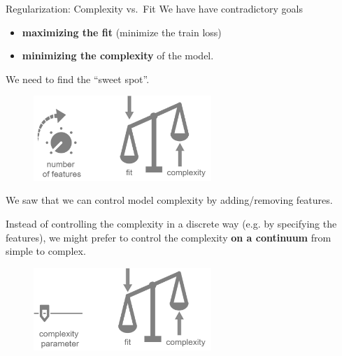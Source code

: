 \begin{vbframe}{Regularization: Complexity vs.~Fit}
We have have contradictory goals
\begin{itemize}
\item \textbf{maximizing the fit} (minimize the train loss)
\item \textbf{minimizing the complexity} of the model.
\end{itemize}

We need to find the \enquote{sweet spot}.

\begin{center}
\begin{figure}
\includegraphics[width=0.6\textwidth]{plots/complexity-vs-fit.png}
\end{figure}
\end{center}

\framebreak

We saw that we can control model complexity by adding/removing features. 

\vfill 

Instead of controlling the complexity in a discrete way (e.g. by specifying
the features), we might prefer to control the complexity
\textbf{on a continuum} from simple to complex.

\vfill

\begin{center}
\begin{figure}
\includegraphics[width=0.6\textwidth]{plots/complexity-vs-fit-continuous.png}
\end{figure}
\end{center}

\end{vbframe}


